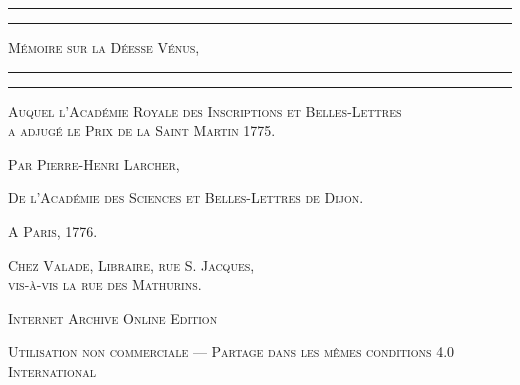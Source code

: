 \documentclass[a4paper, 11pt, oneside, polutonikogreek, french]{article}
\begin{document}
\begin{titlepage} %
	\centering %

	
	\rule{\textwidth}{1.6pt}\vspace*{-\baselineskip}\vspace*{2pt} %
	\rule{\textwidth}{0.4pt} %
	
	\vspace{1\baselineskip} %
	
	{\scshape\Huge Mémoire sur la Déesse Vénus,}
	
	\vspace{1\baselineskip} %

	\rule{\textwidth}{0.4pt}\vspace*{-\baselineskip}\vspace{3.2pt} %
	\rule{\textwidth}{1.6pt} %
	
	\vspace{1\baselineskip} %
	

 {\scshape Auquel l'Académie Royale des Inscriptions et Belles-Lettres\\ a adjugé le Prix de la Saint Martin 1775.} %

 	\vspace*{1\baselineskip} %

	{\scshape \Large Par Pierre-Henri Larcher,} %

 	\vspace*{1\baselineskip} %

{\scshape De l'Académie des Sciences et Belles-Lettres de Dijon.} %

\vspace*{\fill}

	\vspace{1\baselineskip}

	{\small\scshape A Paris, 1776.}
	
	{\small\scshape{Chez Valade, Libraire, rue S. Jacques,\\ vis-à-vis la rue des Mathurins.}}
	
	\vspace{0.5\baselineskip} %

\scshape Internet Archive Online Edition%
	
	{\scshape\small Utilisation non commerciale --- Partage dans les mêmes conditions 4.0 International} %
\end{titlepage}
\setlength{\parskip}{1mm plus1mm minus1mm}
\clearpage
\end{document}
